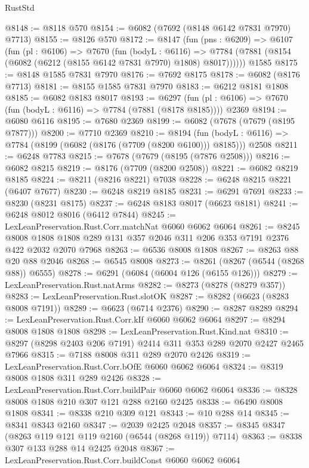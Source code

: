 \begin{lexlean}{RustStd}
\begin{coremodule}
@8148 := @8118 @570
@8154 := @6082 (@7692 (@8148 @6142 @7831 @7970) @7713)
@8155 := @8126 @570
@8172 := @8147
    (fun (pns : @6209) =>
    @6107
      (fun (pl : @6106) =>
      @7670
        (fun (bodyL : @6116) =>
        @7784 (@7881 (@8154 (@6082 (@6212 (@8155 @6142 @7831 @7970) @1808) @8017))))))
    @1585
@8175 := @8148 @1585 @7831 @7970
@8176 := @7692 @8175
@8178 := @6082 (@8176 @7713)
@8181 := @8155 @1585 @7831 @7970
@8183 := @6212 @8181 @1808
@8185 := @6082 @8183 @8017
@8193 := @6297
    (fun (pl : @6106) => @7670 (fun (bodyL : @6116) => @7784 (@7881 (@8178 @8185))))
    @2369
@8194 := @6080 @6116
@8195 := @7680 @2369
@8199 := @6082 (@7678 (@7679 (@8195 @7877)))
@8200 := @7710 @2369
@8210 := @8194
    (fun (bodyL : @6116) => @7784 (@8199 (@6082 (@8176 (@7709 (@8200 @6100))) @8185)))
    @2508
@8211 := @6248 @7783
@8215 := @7678 (@7679 (@8195 (@7876 @2508)))
@8216 := @6082 @8215
@8219 := @8176 (@7709 (@8200 @2508))
@8221 := @6082 @8219 @8185
@8224 := @8211 (@8216 @8221) @7038
@8228 := @6248 @8215 @8221 (@6407 @7677)
@8230 := @6248 @8219 @8185
@8231 := @6291 @7691
@8233 := @8230 (@8231 @8175)
@8237 := @6248 @8183 @8017 (@6623 @8181)
@8241 := @6248 @8012 @8016 (@6412 @7844)
@8245 := LexLeanPreservation.Rust.Corr.matchNat @6060 @6062 @6064
@8261 := @8245
    @8008
    @1808
    @1808
    @289
    @131
    @357
    @2046
    @311
    @206
    @353
    @7191
    @2376
    @422
    @2032
    @2070
    @7968
@8263 := @6536 @8008 @1808
@8267 := @8263 @88 @20 @88 @2046
@8268 := @6545 @8008
@8273 := @8261 (@8267 (@6544 (@8268 @88)) @6555)
@8278 := @6291 (@6084 (@6004 @126 (@6155 @126)))
@8279 := LexLeanPreservation.Rust.natArms
@8282 := @8273 (@8278 (@8279 @357))
@8283 := LexLeanPreservation.Rust.slotOK
@8287 := @8282 (@6623 (@8283 @8008 @7191))
@8289 := @6623 (@6714 @2376)
@8290 := @8287 @8289
@8294 := LexLeanPreservation.Rust.Corr.kIf @6060 @6062 @6064
@8297 := @8294 @8008 @1808 @1808
@8298 := LexLeanPreservation.Rust.Kind.nat
@8310 := @8297 (@8298 @2403 @206 @7191) @2414 @311 @353 @289 @2070 @2427 @2465 @7966
@8315 := @7188 @8008 @311 @289 @2070 @2426
@8319 := LexLeanPreservation.Rust.Corr.bOfE @6060 @6062 @6064
@8324 := @8319 @8008 @1808 @311 @289 @2426
@8328 := LexLeanPreservation.Rust.Corr.buildPair @6060 @6062 @6064
@8336 := @8328 @8008 @1808 @210 @307 @121 @288 @2160 @2425
@8338 := @6490 @8008 @1808
@8341 := @8338 @210 @309 @121
@8343 := @10 @288 @14
@8345 := @8341 @8343 @2160
@8347 := @2039 @2425 @2048
@8357 := @8345 @8347 (@8263 @119 @121 @119 @2160 (@6544 (@8268 @119)) @7114)
@8363 := @8338 @307 @133 @288 @14 @2425 @2048
@8367 := LexLeanPreservation.Rust.Corr.buildConst @6060 @6062 @6064

\end{coremodule}
\end{lexlean}
